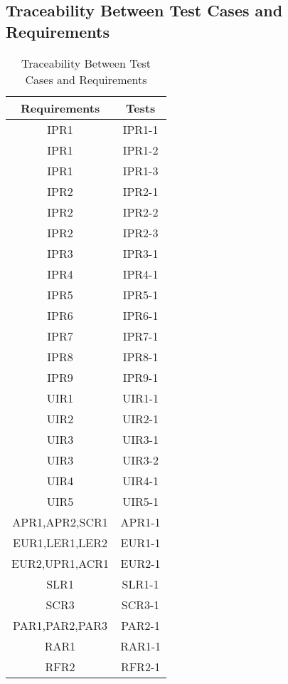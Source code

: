 \documentclass[12pt, titlepage]{article}
\begin{document}
\subsection{Traceability Between Test Cases and Requirements}
\begin{table}
\begin{center}
    \begin{tabular}{||c | c ||}
    \hline
    Requirements & Tests\\
    \hline
    IPR1&IPR1-1\\
    \hline
    IPR1&IPR1-2\\
    \hline
    IPR1&IPR1-3\\
    \hline
    IPR2&IPR2-1\\
    \hline
    IPR2&IPR2-2\\
    \hline
    IPR2&IPR2-3\\
    \hline
    IPR3&IPR3-1\\
    \hline
    IPR4&IPR4-1\\
    \hline
    IPR5&IPR5-1\\
    \hline
    IPR6&IPR6-1\\
    \hline
    IPR7&IPR7-1\\
    \hline
    IPR8&IPR8-1\\
    \hline
    IPR9&IPR9-1\\
    \hline
    UIR1&UIR1-1\\
    \hline
    UIR2&UIR2-1\\
    \hline
    UIR3&UIR3-1\\
    \hline
    UIR3&UIR3-2\\
    \hline
    UIR4&UIR4-1\\
    \hline
    UIR5&UIR5-1\\
    \hline
    APR1,APR2,SCR1 & APR1-1\\
    \hline
    EUR1,LER1,LER2 & EUR1-1\\
    \hline
    EUR2,UPR1,ACR1 & EUR2-1\\
    \hline
    SLR1 & SLR1-1\\
    \hline
    SCR3 & SCR3-1\\
    \hline
    PAR1,PAR2,PAR3 & PAR2-1\\
    \hline
    RAR1 & RAR1-1\\
    \hline
    RFR2 & RFR2-1\\
    \hline
    \end{tabular}    
\end{center}
\caption{Traceability Between Test Cases and Requirements} 
\end{table}
 \newpage
\end{document}
